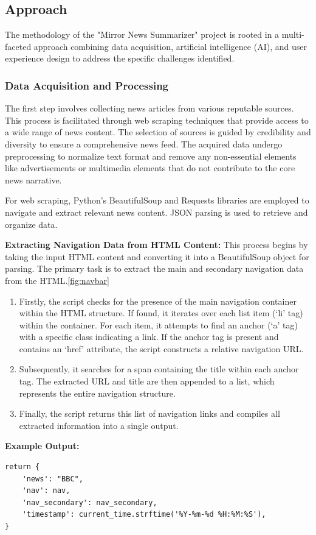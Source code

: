 \documentclass[10pt]{article}
\begin{document}
\subsection{Approach}
The methodology of the "Mirror News Summarizer" project is rooted in a multi-faceted approach combining data acquisition, artificial intelligence (AI), and user experience design to address the specific challenges identified.

\subsubsection{Data Acquisition and Processing}
The first step involves collecting news articles from various reputable sources. This process is facilitated through web scraping techniques that provide access to a wide range of news content. The selection of sources is guided by credibility and diversity to ensure a comprehensive news feed. The acquired data undergo preprocessing to normalize text format and remove any non-essential elements like advertisements or multimedia elements that do not contribute to the core news narrative.

For web scraping, Python's BeautifulSoup and Requests libraries are employed to navigate and extract relevant news content. JSON parsing is used to retrieve and organize data. 


\textbf{Extracting Navigation Data from HTML Content:}
This process begins by taking the input HTML content and converting it into a BeautifulSoup object for parsing. The primary task is to extract the main and secondary navigation data from the HTML.\ref{fig:navbar}
    
\begin{enumerate}
    \item Firstly, the script checks for the presence of the main navigation container within the HTML structure. If found, it iterates over each list item (`li' tag) within the container. For each item, it attempts to find an anchor (`a' tag) with a specific class indicating a link. If the anchor tag is present and contains an `href' attribute, the script constructs a relative navigation URL.
    \item Subsequently, it searches for a span containing the title within each anchor tag. The extracted URL and title are then appended to a list, which represents the entire navigation structure.
    \item Finally, the script returns this list of navigation links and compiles all extracted information into a single output.
\end{enumerate}
\textbf{Example Output:}
\begin{lstlisting}
return {
    'news': "BBC",
    'nav': nav,
    'nav_secondary': nav_secondary,
    'timestamp': current_time.strftime('%Y-%m-%d %H:%M:%S'),
}        
\end{lstlisting}
\end{document}
